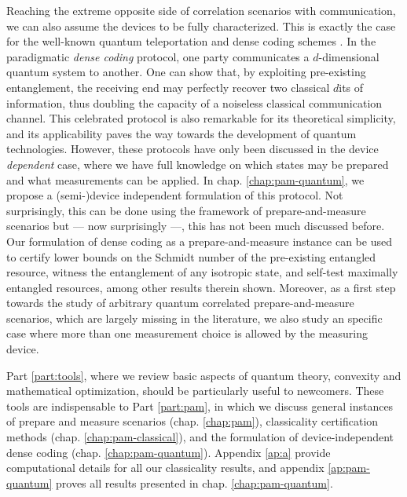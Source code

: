 Reaching the extreme opposite side of correlation scenarios with communication, we can also assume the devices to be fully characterized. This is exactly the case for the well-known quantum teleportation \cite{bennett_1993_teleporting} and dense coding schemes \cite{bennett_1992_superdense}. In the paradigmatic \emph{dense coding} protocol, one party communicates a $d$-dimensional quantum system to another. One can show that, by exploiting pre-existing entanglement, the receiving end may perfectly recover two classical $d$its of information, thus doubling the capacity of a noiseless classical communication channel. This celebrated protocol is also remarkable for its theoretical simplicity, and its applicability paves the way towards the development of quantum technologies. However, these protocols have only been discussed in the device \emph{dependent} case, where we have full knowledge on which states may be prepared and what measurements can be applied. In chap. \ref{chap:pam-quantum}, we propose a (semi-)device independent formulation of this protocol. Not surprisingly, this can be done using the framework of prepare-and-measure scenarios but --- now surprisingly ---, this has not been much discussed before. Our formulation of dense coding as a prepare-and-measure instance can be used to certify lower bounds on the Schmidt number of the pre-existing entangled resource, witness the entanglement of any isotropic state, and self-test maximally entangled resources, among other results therein shown. Moreover, as a first step towards the study of arbitrary quantum correlated prepare-and-measure scenarios, which are largely missing in the literature, we also study an specific case where more than one measurement choice is allowed by the measuring device.

Part \ref{part:tools}, where we review basic aspects of quantum theory, convexity and mathematical optimization, should be particularly useful to newcomers. These tools are indispensable to Part \ref{part:pam}, in which we discuss general instances of prepare and measure scenarios (chap. \ref{chap:pam}), classicality certification methods (chap. \ref{chap:pam-classical}), and the formulation of device-independent dense coding (chap. \ref{chap:pam-quantum}). Appendix \ref{ap:a} provide computational details for all our classicality results, and appendix \ref{ap:pam-quantum} proves all results presented in chap. \ref{chap:pam-quantum}.